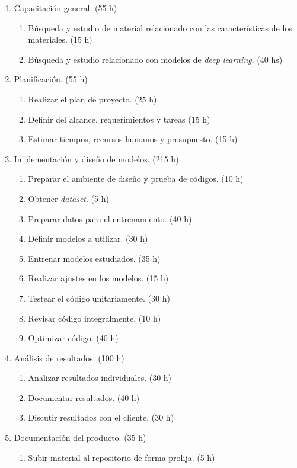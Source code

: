 \documentclass[
11pt, %
codirector, %
]{charter}
\begin{document}
\begin{enumerate}
\item Capacitación general. (55 h)
	\begin{enumerate}
	\item Búsqueda y estudio de material relacionado con las características
	de los materiales. (15 h)
	\item Búsqueda y estudio relacionado con modelos de \textit{deep learning}.
	(40 hs)
	\end{enumerate}
\item Planificación. (55 h)
	\begin{enumerate}
	\item Realizar el plan de proyecto. (25 h)
	\item Definir del alcance, requerimientos y tareas (15 h)
	\item Estimar tiempos, recursos humanos y presupuesto. (15 h)
	\end{enumerate}
\item Implementación y diseño de modelos. (215 h)
	\begin{enumerate}
	\item Preparar el ambiente de diseño y prueba de códigos. (10 h)
	\item Obtener \textit{dataset}. (5 h)
	\item Preparar datos para el entrenamiento. (40 h)
	\item Definir modelos a utilizar. (30 h)
	\item Entrenar modelos estudiados. (35 h)
	\item Realizar ajustes en los modelos. (15 h)
	\item Testear el código unitariamente. (30 h)
	\item Revisar código integralmente. (10 h)
	\item Optimizar código. (40 h)
	\end{enumerate}
\item Análisis de resultados. (100 h)
	\begin{enumerate}
	\item Analizar resultados individuales. (30 h)
	\item Documentar resultados. (40 h)
	\item Discutir resultados con el cliente. (30 h)
	\end{enumerate}
\item Documentación del producto. (35 h)
	\begin{enumerate}
		\item Subir material al repositorio de forma prolija. (5 h)

\end{enumerate}
\end{enumerate}
\end{document}
